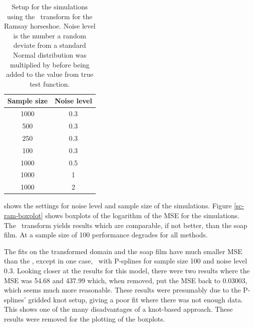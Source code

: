 \begin{table}[tb]
\centering
\begin{tabular}{c c}\\
Sample size & Noise level \\
\hline
1000 & 0.3 \\
500 & 0.3 \\
250 & 0.3 \\
100 & 0.3 \\
1000 & 0.5 \\
1000 & 1 \\
1000 & 2 \\
\end{tabular}
\caption{Setup for the simulations using the \sch\ transform for the Ramsay horseshoe. Noise level is the number a random deviate from a standard Normal distribution was multiplied by before being added to the value from true test function.}
\label{scramsimtable}
\end{table}

 shows the settings for noise level and sample size of the simulations. Figure \ref{sc-ram-boxplot} shows boxplots of the logarithm of the MSE for the simulations. The \sch\ transform yields results which are comparable, if not better, than the soap film. At a sample size of 100 performance degrades for all methods. 

The fits on the transformed domain and the soap film have much smaller MSE than the \tprs, except in one case, \sch\ with P-splines for sample size 100 and noise level 0.3. Looking closer at the results for this model, there were two results where the MSE was 54.68 and 437.99 which, when removed, put the MSE back to 0.03003, which seems much more reasonable. These results were presumably due to the P-splines' gridded knot setup, giving a poor fit where there was not enough data. This shows one of the many disadvantages of a knot-based approach. These results were removed for the plotting of the boxplots.

